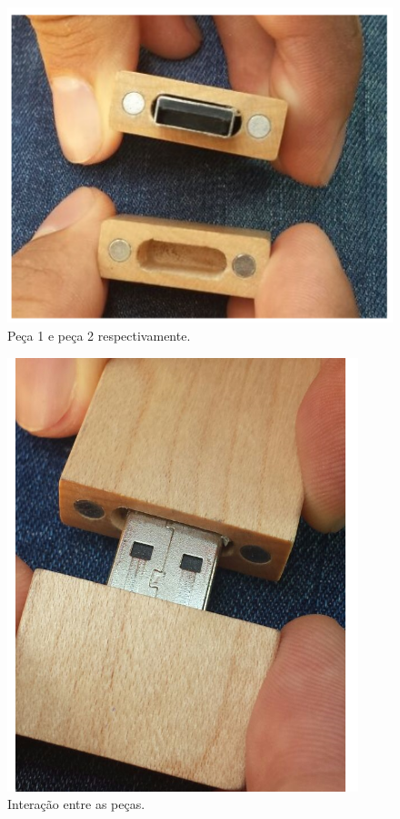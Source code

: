\begin{itemize}
\begin{enumerate}
			\begin{figure}[H]
				\centering
				\includegraphics[scale=0.55]{figuras/peca1peca2.png}
				\caption{Peça 1 e peça 2 respectivamente.}
				\label{img:plug_peças}
			\end{figure}

			\begin{figure}[H]
				\centering
				\includegraphics[scale=0.55]{figuras/interacaopolosmagneticos.png}
				\caption{Interação entre as peças.}
				\label{img:interação_plug_peças}
			\end{figure}


\end{enumerate}
\end{itemize}
